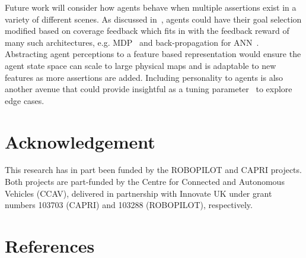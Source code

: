 \documentclass[letterpaper, 10 pt, journal, twoside]{IEEEtran}
\begin{document}
%
Future work will consider how agents behave when multiple assertions %
exist in a variety of different scenes. %
As discussed in~\cite{Eder2007}, agents could have their goal selection modified based on coverage feedback %
which fits in with the feedback reward of many such architectures, e.g. MDP~\cite{littman1994markov} and back-propagation for ANN~\cite{foerster2016learning}. %
%
Abstracting agent perceptions to a feature based representation would ensure the agent state space can scale to large physical maps and is adaptable to new features as more assertions are added. %
Including personality to agents is also another avenue that could provide insightful as a tuning parameter~\cite{Zoumpoulaki2010} to explore edge cases. %



\section*{Acknowledgement}
This research has in part been funded by the ROBOPILOT and CAPRI projects. Both
projects are part-funded by the Centre for Connected and Autonomous
Vehicles (CCAV), delivered in partnership with Innovate UK under grant numbers
103703 (CAPRI) and 103288 (ROBOPILOT), respectively.


\balance
\section*{References}
\printbibliography[heading=none]
\end{document}
